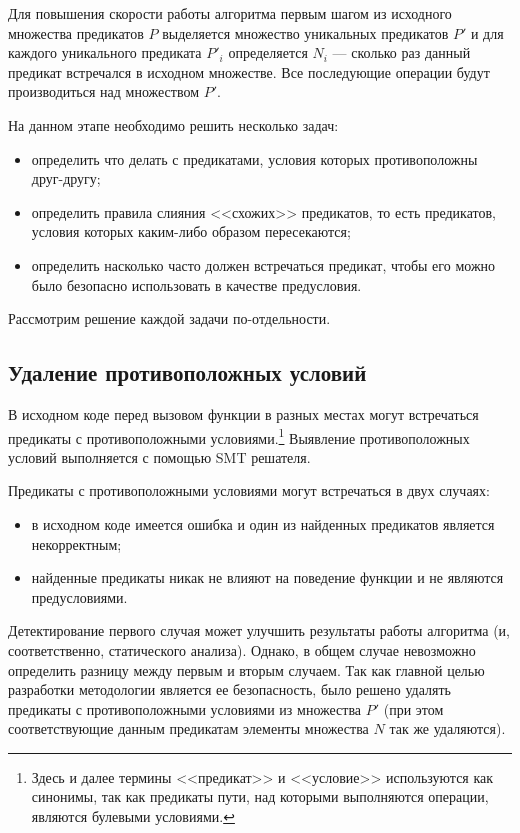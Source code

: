 Для повышения скорости работы алгоритма первым шагом из исходного множества предикатов $P$ выделяется множество уникальных предикатов $P'$ и для каждого уникального предиката $P'_i$ определяется $N_i$ --- сколько раз данный предикат встречался в исходном множестве. Все последующие операции будут производиться над множеством $P'$.

На данном этапе необходимо решить несколько задач:
\begin{itemize}
\item определить что делать с предикатами, условия которых противоположны друг-другу;
\item определить правила слияния <<схожих>> предикатов, то есть предикатов, условия которых каким-либо образом пересекаются;
\item определить насколько часто должен встречаться предикат, чтобы его можно было безопасно использовать в качестве предусловия.
\end{itemize}

Рассмотрим решение каждой задачи по-отдельности.

\subsection{Удаление противоположных условий}
В исходном коде перед вызовом функции в разных местах могут встречаться предикаты с противоположными условиями.\footnote{Здесь и далее термины <<предикат>> и <<условие>> используются как синонимы, так как предикаты пути, над которыми выполняются операции, являются булевыми условиями.} Выявление противоположных условий выполняется с помощью SMT решателя. 

Предикаты с противоположными условиями могут встречаться в двух случаях:
\begin{itemize}
\item в исходном коде имеется ошибка и один из найденных предикатов является некорректным;
\item найденные предикаты никак не влияют на поведение функции и не являются предусловиями.
\end{itemize}
Детектирование первого случая может улучшить результаты работы алгоритма (и, соответственно, статического анализа). Однако, в общем случае невозможно определить разницу между первым и вторым случаем. Так как главной целью разработки методологии является ее безопасность, было решено удалять предикаты с противоположными условиями из множества $P'$ (при этом соответствующие данным предикатам элементы множества $N$ так же удаляются).

